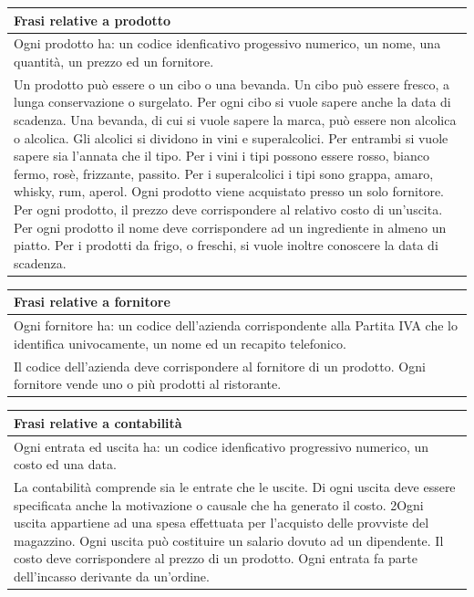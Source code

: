 \begin{longtable}{|p{15.5cm}|}
    \hline
    \textbf{Frasi relative a prodotto} \\ \hline
    Ogni prodotto ha: un codice idenficativo progessivo numerico, un nome, una quantità, un prezzo ed un fornitore.\\
    Un prodotto può essere o un cibo o una bevanda.
    Un cibo può essere fresco, a lunga conservazione o surgelato. Per ogni cibo si vuole
    sapere anche la data di scadenza.
    Una bevanda, di cui si vuole sapere la marca, può essere non alcolica o alcolica. Gli
    alcolici si dividono in vini e superalcolici. Per entrambi si vuole sapere sia l’annata che
    il tipo.
    Per i vini i tipi possono essere rosso, bianco fermo, rosè, frizzante, passito. Per i
    superalcolici i tipi sono grappa, amaro, whisky, rum, aperol.
    Ogni prodotto viene acquistato presso un solo fornitore.
    Per ogni prodotto, il prezzo deve corrispondere al relativo costo di un’uscita.
    Per ogni prodotto il nome deve corrispondere ad un ingrediente in almeno un piatto.
    Per i prodotti da frigo, o freschi, si vuole inoltre conoscere la data di scadenza.\\ \hline
\end{longtable}

\begin{longtable}{|p{15.5cm}|}
    \hline
    \textbf{Frasi relative a fornitore} \\ \hline
    Ogni fornitore ha: un codice dell'azienda corrispondente alla Partita IVA che lo identifica univocamente, un nome ed un recapito telefonico.\\
    Il codice dell’azienda deve corrispondere al fornitore di un prodotto.
    Ogni fornitore vende uno o più prodotti al ristorante.
    \\ \hline
\end{longtable}

\begin{longtable}{|p{15.5cm}|}
    \hline
    \textbf{Frasi relative a contabilità} \\ \hline
    Ogni entrata ed uscita ha: un codice idenficativo progressivo numerico, un costo ed una data.\\
    La contabilità comprende sia le entrate che le uscite.
    Di ogni uscita deve essere specificata anche la motivazione o causale che ha generato
    il costo.
    2Ogni uscita appartiene ad una spesa effettuata per l’acquisto delle provviste del magazzino.
    Ogni uscita può costituire un salario dovuto ad un dipendente.
    Il costo deve corrispondere al prezzo di un prodotto.
    Ogni entrata fa parte dell’incasso derivante da un’ordine.
    \\ \hline
\end{longtable}

